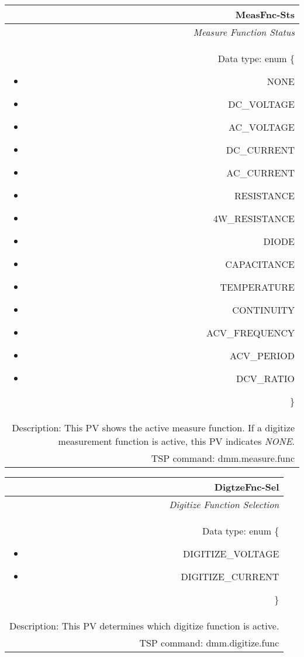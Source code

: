 \documentclass[openany]{article}
\begin{document}
		\begin{tabular}{N}
			\hline
			\bfseries MeasFnc-Sts\label{pv:measfnc-sts} \\ \hline
			\emph{Measure Function Status} \\
			Data type: enum \{\begin{itemize}[noitemsep]
				\small
				\item[] NONE
				\item[] DC\_VOLTAGE
				\item[] AC\_VOLTAGE
				\item[] DC\_CURRENT
				\item[] AC\_CURRENT
				\item[] RESISTANCE
				\item[] 4W\_RESISTANCE
				\item[] DIODE
				\item[] CAPACITANCE
				\item[] TEMPERATURE
				\item[] CONTINUITY
				\item[] ACV\_FREQUENCY
				\item[] ACV\_PERIOD
				\item[] DCV\_RATIO
			\end{itemize}\} \\
			Description: This PV shows the active measure function. If a digitize measurement function is active, this PV indicates \emph{NONE}. \\
			TSP command: dmm.measure.func
		\end{tabular}

		\begin{tabular}{N}
			\hline
			\bfseries DigtzeFnc-Sel\label{pv:digtzefnc-sel} \\ \hline
			\emph{Digitize Function Selection} \\
			Data type: enum \{\begin{itemize}[noitemsep]
				\small
				\item[] DIGITIZE\_VOLTAGE
				\item[] DIGITIZE\_CURRENT
			\end{itemize}\} \\
			Description: This PV determines which digitize function is active. \\
			TSP command: dmm.digitize.func
		\end{tabular}
\end{document}
